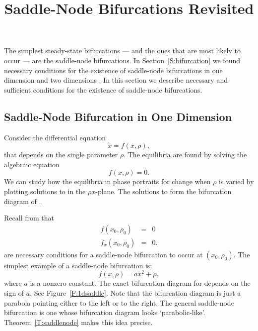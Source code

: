 \documentclass{ximera}
\title{Saddle-Node Bifurcations Revisited}
\begin{document}
\begin{abstract}
\end{abstract}
\maketitle


\label{S:SNB}
  


The simplest steady-state bifurcations --- and the ones that are most
likely to occur --- are the saddle-node bifurcations.  In 
Section~\ref{S:bifurcation} we found necessary conditions for the existence 
of saddle-node bifurcations in one dimension  and two 
dimensions .  In this section we describe necessary and 
sufficient conditions for the existence of saddle-node bifurcations.


\subsection*{Saddle-Node Bifurcation in One Dimension}

Consider the differential equation 
\begin{equation} \label{e:1dbif}
\dot{x} = f(x,\rho),
\end{equation}
that depends on the single parameter $\rho$.  The equilibria are 
found by solving the algebraic equation 
\begin{equation} \label{e:1dstst}
f(x,\rho) = 0.
\end{equation}
We can study how the equilibria in phase portraits for  
change when $\rho$ is varied by plotting
solutions to  in the $\rho x$-plane.  The solutions to
 form the bifurcation diagram of .

Recall from  that  
\begin{equation}  \label{e:1dbifcond}
\begin{array}{rcl}
f(x_0,\rho_0) & = & 0 \\
f_x(x_0,\rho_0) & = & 0.
\end{array}
\end{equation}
are necessary conditions for a saddle-node bifurcation to occur at
$(x_0,\rho_0)$.  The simplest example of a saddle-node bifurcation is:
\begin{equation}  \label{e:1dsaddlenf}
f(x,\rho) = a x^2 + \rho,
\end{equation}
where $a$ is a nonzero constant.  The exact bifurcation diagram for 
 depends on the sign of $a$.  See Figure~\ref{F:1dsaddle}.  
Note that the bifurcation diagram is just a parabola pointing either to the 
left or to the right.  The general saddle-node bifurcation is one whose 
bifurcation diagram looks `parabolic-like'.  Theorem~\ref{T:saddlenode}
makes this idea precise.
\end{document}
